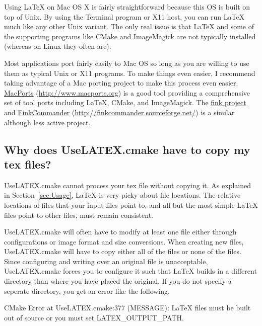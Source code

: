 \documentclass{article}
\newcommand*{\textfile}[1]{\textsf{#1}}
\newcommand*{\UseLATEX}{\textfile{UseLATEX.cmake}\xspace}
\newcommand*{\latex}{\LaTeX\xspace}
\begin{document}
  Using \latex on Mac OS X is fairly straightforward because this OS is
  built on top of Unix.  By using the Terminal program or X11 host, you can
  run \latex much like any other Unix variant.  The only real issue is that
  \latex and some of the supporting programs like CMake and ImageMagick are
  not typically installed (whereas on Linux they often are).

  Most applications port fairly easily to Mac OS so long as you are willing
  to use them as typical Unix or X11 programs.  To make things even easier,
  I recommend taking advantage of a Mac porting project to make this
  process even easier.  \href{http://www.macports.org}{MacPorts}
  (\href{http://www.macports.org}{http://www.macports.org}) is a good tool
  providing a comprehensive set of tool ports including \latex, CMake, and
  ImageMagick.  The \href{http://www.finkproject.org/}{fink project} and
  \href{http://finkcommander.sourceforge.net/}{FinkCommander}
  (\href{http://finkcommander.sourceforge.net/}{http://finkcommander.sourceforge.net/})
  is a similar although less active project.

  \subsection{Why does \UseLATEX have to copy my tex files?}
  \label{sec:Why_does_UseLATEX_have_to_copy_my_tex_files}

  \UseLATEX cannot process your tex file without copying it.  As explained
  in Section~\ref{sec:Usage}, \latex is very picky about file locations.
  The relative locations of files that your input files point to, and all
  but the most simple \latex files point to other files, must remain
  consistent.

  \UseLATEX will often have to modify at least one file either through
  configurations or image format and size conversions.  When creating new
  files, \UseLATEX will have to copy either all of the files or none of the
  files.  Since configuring and writing over an original file is
  unacceptable, \UseLATEX forces you to configure it such that \latex
  builds in a different directory than where you have placed the original.
  If you do not specify a seperate directory, you get an error like the
  following.

  \begin{CodeListing}
CMake Error at UseLATEX.cmake:377 (MESSAGE):
  LaTeX files must be built out of source or you must set
  LATEX_OUTPUT_PATH.
  \end{CodeListing}
\end{document}
